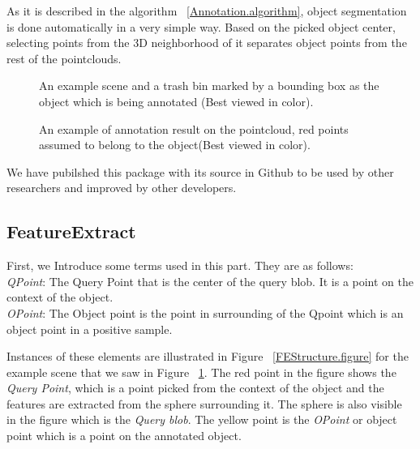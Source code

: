 As it is described in the algorithm ~\ref{Annotation.algorithm}, object segmentation is done automatically in a very 
simple way. Based on the picked object center, selecting points from the 3D neighborhood of it separates object points from the 
rest of the pointclouds.

\begin{figure}[t]
  \caption[Example scene and object for Annotation tool]
  {An example scene and a trash bin marked by a bounding box as the object which is being annotated (Best viewed in color).}
  \label{TrashbinBounding.figure}
\end{figure}

\begin{figure}[t]
  \caption[Annotation tool result]
  {An example of annotation result on the pointcloud, red points assumed to belong to the object(Best viewed in color).}
  \label{Annotation.figure}
\end{figure}

We have pubilshed this package with its source in Github to be used by other researchers and improved by other developers.\cite{AnnotationGithub}


\subsection{FeatureExtract}
\label{FeatureExtract.ssec}



First, we Introduce some terms used in this part. They are as follows:
\\
  {\it QPoint}: The Query Point that is the center of the query blob. It is a point on the context of the object.
  \\
  {\it OPoint}: The Object point is the point in surrounding of the Qpoint which is an object point in a positive sample.
 
 Instances of these elements are illustrated in Figure ~\ref{FEStructure.figure} for the example scene that we saw in Figure 
 ~\ref{TrashbinBounding.figure}. 
 The red point in the figure shows the {\it Query Point}, which is a point picked from the context of the object and the features are extracted from the sphere surrounding it. The sphere is also visible in the figure which is the 
{\it Query blob}. 
 The yellow point is the {\it OPoint} or object point which is a point on the annotated object. 
 
